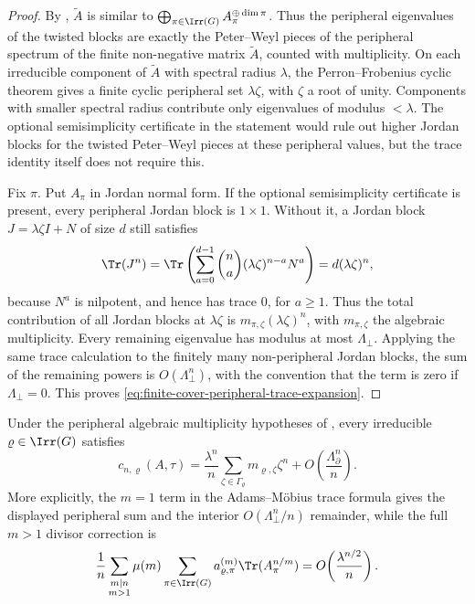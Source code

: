 \begin{proof}
  By ,
  \(\widetilde A\) is similar to
  \(\bigoplus_{\pi\in\Irr(G)}A_\pi^{\oplus\dim\pi}\).  Thus the peripheral
  eigenvalues of the twisted blocks are exactly the Peter--Weyl pieces of
  the peripheral spectrum of the finite non-negative matrix
  \(\widetilde A\), counted with multiplicity.  On each irreducible
  component of \(\widetilde A\) with spectral radius \(\lambda\), the
  Perron--Frobenius cyclic theorem gives a finite cyclic peripheral set
  \(\lambda\zeta\), with \(\zeta\) a root of unity.  Components with smaller
  spectral radius contribute only eigenvalues of modulus \(<\lambda\).  The
  optional semisimplicity certificate in the statement would rule out higher
  Jordan blocks for the twisted Peter--Weyl pieces at these peripheral
  values, but the trace identity itself does not require this.

  Fix \(\pi\).  Put \(A_\pi\) in Jordan normal form.  If the optional
  semisimplicity certificate is present, every peripheral Jordan block is
  \(1\times1\).
  Without it, a Jordan block \(J=\lambda\zeta I+N\) of size \(d\) still
  satisfies
  \[
    \Tr(J^n)
    =
    \Tr\left(\sum_{a=0}^{d-1}\binom na(\lambda\zeta)^{n-a}N^a\right)
    =
    d(\lambda\zeta)^n,
  \]
  because \(N^a\) is nilpotent, and hence has trace \(0\), for \(a\ge1\).
  Thus the total contribution of all Jordan blocks at \(\lambda\zeta\) is
  \(m_{\pi,\zeta}(\lambda\zeta)^n\), with \(m_{\pi,\zeta}\) the algebraic
  multiplicity.  Every remaining eigenvalue has modulus at most
  \(\Lambda_\perp\).  Applying the same trace calculation to the finitely
  many non-peripheral Jordan blocks, the sum of the remaining powers is
  \(O(\Lambda_\perp^n)\), with the convention that the term is zero if
  \(\Lambda_\perp=0\).  This proves
  \eqref{eq:finite-cover-peripheral-trace-expansion}.
\end{proof}

\begin{proposition}
  \label{prop:peripheral-primitive-channel-asymptotic-component}
  Under the peripheral algebraic multiplicity hypotheses of
  ,
  every irreducible \(\varrho\in\Irr(G)\) satisfies
  \begin{equation}\label{eq:peripheral-primitive-channel-asymptotic-component}
    c_{n,\varrho}(A,\tau)
    =
    \frac{\lambda^n}{n}
      \sum_{\zeta\in\Gamma_\varrho}m_{\varrho,\zeta}\zeta^n
    +
    O\!\left(\frac{\Lambda_\partial^n}{n}\right).
  \end{equation}
  More explicitly, the \(m=1\) term in the Adams--M\"obius trace formula
  gives the displayed peripheral sum and the interior
  \(O(\Lambda_\perp^n/n)\) remainder, while the full \(m>1\) divisor
  correction is
  \[
    \frac{1}{n}\sum_{\substack{m\mid n\\m>1}}\mu(m)
      \sum_{\pi\in\Irr(G)}
        a_{\varrho,\pi}^{(m)}\Tr(A_\pi^{n/m})
    =
    O\!\left(\frac{\lambda^{n/2}}{n}\right).
  \]
\end{proposition}

